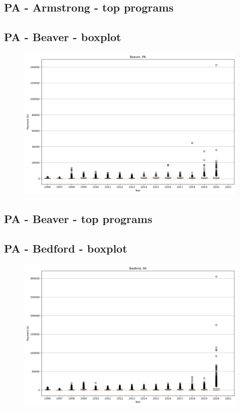 \subsection*{PA - Armstrong - top programs}

\newpage
\subsection*{PA - Beaver - boxplot}
\begin{figure}[h]
\centering
\includegraphics[width=7in]{../output/boxplots/counties/Beaver-PA_boxplot.png}
\end{figure}


\subsection*{PA - Beaver - top programs}

\newpage
\subsection*{PA - Bedford - boxplot}
\begin{figure}[h]
\centering
\includegraphics[width=7in]{../output/boxplots/counties/Bedford-PA_boxplot.png}
\end{figure}


